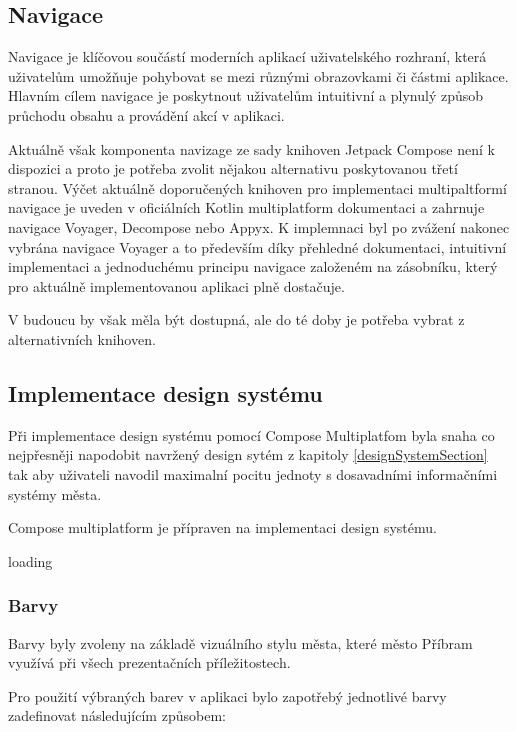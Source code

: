 \subsection{Navigace}
Navigace je klíčovou součástí moderních aplikací uživatelského rozhraní, která uživatelům umožňuje pohybovat se mezi různými obrazovkami či 
částmi aplikace. Hlavním cílem navigace je poskytnout uživatelům intuitivní a plynulý způsob průchodu obsahu a provádění akcí v aplikaci. 

Aktuálně však komponenta navizage ze sady knihoven Jetpack Compose není k dispozici a proto je potřeba zvolit nějakou alternativu poskytovanou
třetí stranou. \cite{composeNav} Výčet aktuálně doporučených knihoven pro implementaci multipaltformí navigace je uveden v oficiálních Kotlin 
multiplatform dokumentaci a zahrnuje navigace Voyager, Decompose nebo Appyx. K implemnaci byl po zvážení nakonec vybrána navigace Voyager a 
to především díky přehledné dokumentaci, intuitivní implementaci a jednoduchému principu navigace založeném na zásobníku, který pro aktuálně
implementovanou aplikaci plně dostačuje.

V budoucu by však měla být dostupná, ale do té doby je potřeba vybrat z alternativních knihoven.



\subsection{Implementace design systému}

Při implementace design systému pomocí Compose Multiplatfom byla snaha co nejpřesněji napodobit navržený design sytém z kapitoly \ref{designSystemSection}
tak aby uživateli navodil maximalní pocitu jednoty s dosavadními informačními systémy města.


Compose multiplatform je přípraven na implementaci design systému. 

loading


\subsubsection{Barvy} \label{colorSection}
Barvy byly zvoleny na základě vizuálního stylu města, které město Příbram využívá při všech prezentačních příležitostech.

Pro použití výbraných barev v aplikaci bylo zapotřebý jednotlivé barvy zadefinovat následujícím způsobem:

